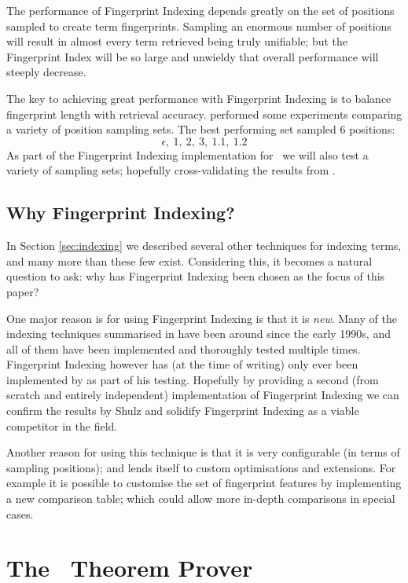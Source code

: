 The performance of Fingerprint Indexing depends greatly on the set of positions sampled
to create term fingerprints. Sampling an enormous number of positions will result in
almost every term retrieved being truly unifiable; but the Fingerprint Index will
be so large and unwieldy that overall performance will steeply decrease.

The key to achieving great performance with Fingerprint Indexing is to balance
fingerprint length with retrieval accuracy.  performed some experiments
comparing a variety of position sampling sets. The best performing set sampled
6 positions:
  \[\epsilon,\  1,\  2,\  3,\  1.1,\  1.2\]
As part of the Fingerprint Indexing implementation for \beagle\ we will also test
a variety of sampling sets; hopefully cross-validating the results from .

\subsection{Why Fingerprint Indexing?}

In Section \ref{sec:indexing} we described several other techniques for indexing
terms, and many more than these few exist. Considering this, it becomes a natural question to ask:
why has Fingerprint Indexing been chosen as the focus of this paper?

One major reason is for using Fingerprint Indexing is that it is \emph{new}. Many of the indexing
techniques summarised in \cite{indexing} have been around since the early 1990s, and all of
them have been implemented and thoroughly tested multiple times. Fingerprint
Indexing however has (at the time of writing) only ever been implemented by 
as part of his testing. Hopefully by providing a second (from scratch and entirely independent)
implementation of Fingerprint Indexing we can confirm the results by Shulz and
solidify Fingerprint Indexing as a viable competitor in the field.

Another reason for using this technique is that it is very configurable (in terms
of sampling positions); and lends itself to custom optimisations and extensions.
For example it is possible to customise the set of fingerprint features by implementing a new comparison table;
which could allow more in-depth comparisons in special cases.

\section{The \Beagle\ Theorem Prover}
\label{sec:beagle}

